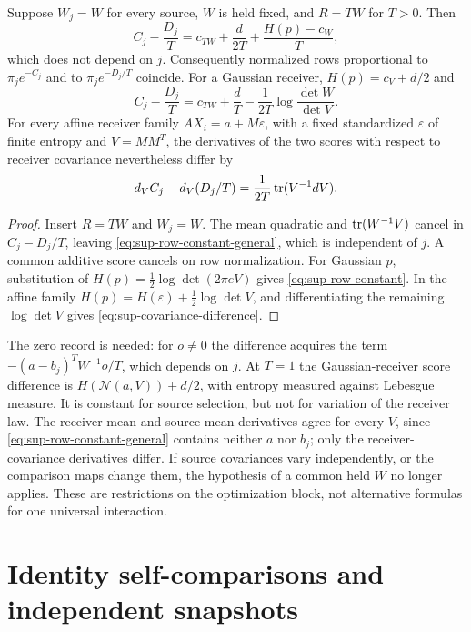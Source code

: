 Suppose $W_j=W$ for every source, $W$ is held fixed, and $R=TW$ for $T>0$. Then
\begin{equation}
 C_j-\frac{D_j}{T}
 =c_{TW}+\frac d{2T}+\frac{H(p)-c_W}{T},
 \label{eq:sup-row-constant-general}
\end{equation}
which does not depend on $j$. Consequently normalized rows proportional to $\pi_je^{-C_j}$ and to $\pi_je^{-D_j/T}$ coincide. For a Gaussian receiver, $H(p)=c_V+d/2$ and
\begin{equation}
 C_j-\frac{D_j}{T}
 =c_{TW}+\frac dT-\frac1{2T}\log\frac{\det W}{\det V}.
 \label{eq:sup-row-constant}
\end{equation}
For every affine receiver family $AX_i=a+M\varepsilon$, with a fixed standardized $\varepsilon$ of finite entropy and $V=MM^T$, the derivatives of the two scores with respect to receiver covariance nevertheless differ by
\begin{equation}
 d_VC_j-d_V(D_j/T)=\frac1{2T}\operatorname{tr}(V^{-1}dV).
 \label{eq:sup-covariance-difference}
\end{equation}
\begin{proof}
Insert $R=TW$ and $W_j=W$. The mean quadratic and $\operatorname{tr}(W^{-1}V)$ cancel in $C_j-D_j/T$, leaving \cref{eq:sup-row-constant-general}, which is independent of $j$. A common additive score cancels on row normalization. For Gaussian $p$, substitution of $H(p)=\tfrac12\log\det(2\pi eV)$ gives \cref{eq:sup-row-constant}. In the affine family $H(p)=H(\varepsilon)+\tfrac12\log\det V$, and differentiating the remaining $\log\det V$ gives \cref{eq:sup-covariance-difference}.
\end{proof}

The zero record is needed: for $o\neq0$ the difference acquires the term $-(a-b_j)^TW^{-1}o/T$, which depends on $j$. At $T=1$ the Gaussian-receiver score difference is $H(\mathcal N(a,V))+d/2$, with entropy measured against Lebesgue measure. It is constant for source selection, but not for variation of the receiver law. The receiver-mean and source-mean derivatives agree for every $V$, since \cref{eq:sup-row-constant-general} contains neither $a$ nor $b_j$; only the receiver-covariance derivatives differ. If source covariances vary independently, or the comparison maps change them, the hypothesis of a common held $W$ no longer applies. These are restrictions on the optimization block, not alternative formulas for one universal interaction.

\section{Identity self-comparisons and independent snapshots}

